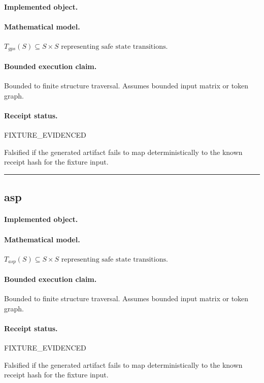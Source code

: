 \paragraph{Implemented object.} 
\paragraph{Mathematical model.} $T_{gps}(S) \subseteq S \times S \text{ representing safe state transitions}.$
\paragraph{Bounded execution claim.} Bounded to finite structure traversal. Assumes bounded input matrix or token graph.
\paragraph{Receipt status.} FIXTURE\_EVIDENCED
\begin{falsifier}
Falsified if the generated artifact fails to map deterministically to the known receipt hash for the fixture input.
\end{falsifier}

\vspace{1em}\hrule\vspace{1em}
\subsection{asp}
\paragraph{Implemented object.} 
\paragraph{Mathematical model.} $T_{asp}(S) \subseteq S \times S \text{ representing safe state transitions}.$
\paragraph{Bounded execution claim.} Bounded to finite structure traversal. Assumes bounded input matrix or token graph.
\paragraph{Receipt status.} FIXTURE\_EVIDENCED
\begin{falsifier}
Falsified if the generated artifact fails to map deterministically to the known receipt hash for the fixture input.
\end{falsifier}

